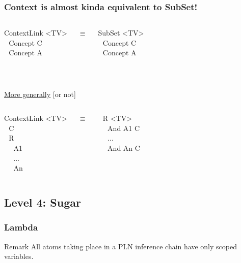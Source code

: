 \documentclass{beamer}
\begin{document}
\frame
{
  \frametitle{Context is almost kinda equivalent to SubSet!}

  \begin{columns}
    \column{1.9in}

    ContextLink <TV>\\
    $\ \ \ $Concept C\\
    $\ \ \ $Concept A\\

    \column{.05in}
    
    $\equiv$
    
    \column{2in}
  
    SubSet <TV>\\
    $\ \ \ $Concept C\\
    $\ \ \ $Concept A\\
  \end{columns}

  $\ $\\[.5cm]

  \pause

  \underline{More generally} [or not]
  \begin{columns}
    \column{1.9in}

    ContextLink <TV>\\
    $\ \ \ $C\\
    $\ \ \ $R\\
    $\ \ \ $$\ \ \ $A1\\
    $\ \ \ $$\ \ \ $...\\
    $\ \ \ $$\ \ \ $An\\

    \column{.05in}
    
    $\equiv$
    
    \column{2in}
 
    $\ \ \ $R <TV>\\
    $\ \ \ $$\ \ \ $And A1 C\\
    $\ \ \ $$\ \ \ $...\\
    $\ \ \ $$\ \ \ $And An C\\
 
  \end{columns}
}

\subsection{Level 4: Sugar}

\frame
{
  \frametitle{Lambda}

  \begin{beamerboxesrounded}{Remark}
    All atoms taking place in a PLN inference chain have \alert{only
    scoped variables}.
  \end{beamerboxesrounded}

}
\end{document}
